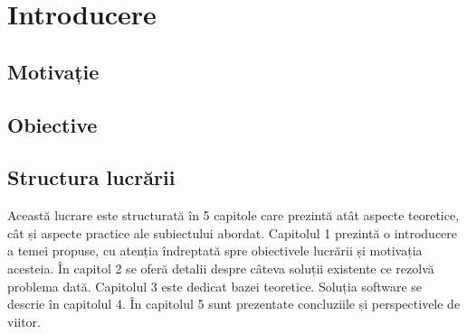 \chapter{Introducere}
\label{intro}

\section{Motivație}
\label{section:ch1sec1}


\section{Obiective}
\label{section:ch1sec2}


\section{Structura lucrării}
\label{section:ch1sec3}

Această lucrare este structurată în 5 capitole care prezintă atât aspecte teoretice, cât și aspecte practice ale subiectului abordat. Capitolul 1 prezintă o introducere a temei propuse, cu atenția îndreptată spre obiectivele lucrării și motivația acesteia. În capitol 2 se oferă detalii despre câteva soluții existente ce rezolvă problema dată. Capitolul 3 este dedicat bazei teoretice. Soluția software se descrie în capitolul 4. În capitolul 5 sunt prezentate concluziile și perspectivele de viitor.
